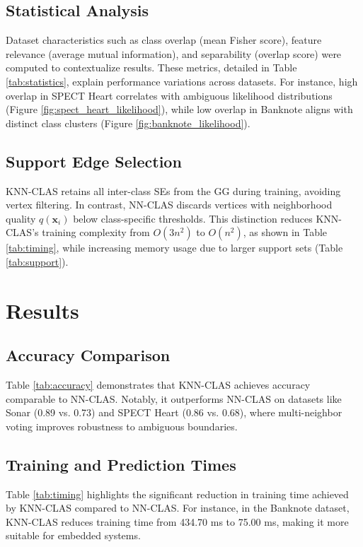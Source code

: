 \documentclass[conference]{IEEEtran}
\begin{document}
\subsection{Statistical Analysis}
Dataset characteristics such as class overlap (mean Fisher score), feature relevance (average mutual information), and separability (overlap score) were computed to contextualize results. These metrics, detailed in Table \ref{tab:statistics}, explain performance variations across datasets. For instance, high overlap in SPECT Heart correlates with ambiguous likelihood distributions (Figure \ref{fig:spect_heart_likelihood}), while low overlap in Banknote aligns with distinct class clusters (Figure \ref{fig:banknote_likelihood}).

\subsection{Support Edge Selection}
KNN-CLAS retains all inter-class SEs from the GG during training, avoiding vertex filtering. In contrast, NN-CLAS discards vertices with neighborhood quality \(q(\mathbf{x}_i)\) below class-specific thresholds. This distinction reduces KNN-CLAS's training complexity from \( O(3n^2) \) to \( O(n^2) \), as shown in Table \ref{tab:timing}, while increasing memory usage due to larger support sets (Table \ref{tab:support}).

\section{Results}

\subsection{Accuracy Comparison}

Table \ref{tab:accuracy} demonstrates that KNN-CLAS achieves accuracy comparable to NN-CLAS. Notably, it outperforms NN-CLAS on datasets like Sonar (0.89 vs. 0.73) and SPECT Heart (0.86 vs. 0.68), where multi-neighbor voting improves robustness to ambiguous boundaries.

\subsection{Training and Prediction Times}

Table \ref{tab:timing} highlights the significant reduction in training time achieved by KNN-CLAS compared to NN-CLAS. For instance, in the Banknote dataset, KNN-CLAS reduces training time from 434.70 ms to 75.00 ms, making it more suitable for embedded systems.
\end{document}
